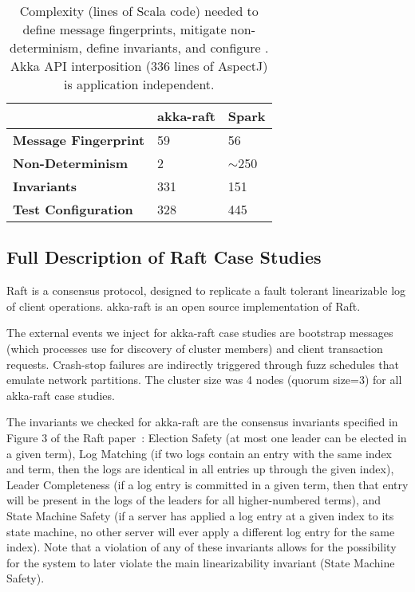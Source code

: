 \begin{table}
\centering
\footnotesize
\begin{tabular}{|l|l|l|}
  \cline{2-3}
  \multicolumn{1}{c|}{~} & \textbf{akka-raft} & \textbf{Spark} \\\cline{2-3} \hline
{\bf Message Fingerprint} & 59 & 56 \\
\hline
{\bf Non-Determinism} & 2 & {\footnotesize $\sim$}250 \\
\hline
{\bf Invariants} & 331 & 151 \\
\hline
{\bf Test Configuration} & 328 & 445 \\
\hline
\end{tabular}
\caption{Complexity (lines of Scala code) needed to define message
fingerprints, mitigate non-determinism, define invariants, and configure \sys.
Akka API interposition (336 lines of AspectJ) is application independent.}
\label{tab:instrumentation}
\end{table}

\subsection{Full Description of Raft Case Studies}
\label{app:raft_case_studies}

Raft is a consensus protocol, designed to replicate a fault tolerant linearizable log of
client operations. akka-raft is an open source implementation of Raft.

The external events we inject for akka-raft case studies are
bootstrap messages (which
processes use for discovery of cluster members)
and client transaction requests. Crash-stop failures are indirectly triggered through
fuzz schedules that emulate network partitions.
The cluster size was 4 nodes
(quorum size=3) for all akka-raft case studies.

The invariants we checked for akka-raft are the consensus invariants specified in
Figure 3 of the Raft paper~\cite{ongaro2014search}: Election Safety
(at most one leader can be elected in a
given term), Log Matching (if two logs contain an entry with the same
index and term, then the logs are identical in all entries
up through the given index), Leader Completeness (if a log entry is
committed in a
given term, then that entry will be present in the logs
of the leaders for all higher-numbered terms), and State Machine Safety
(if a server has applied a log entry
at a given index to its state machine, no other server
will ever apply a different log entry for the same index). Note that a
violation of any of these invariants allows for the possibility for the system
to later violate
the main linearizability invariant (State Machine Safety).

